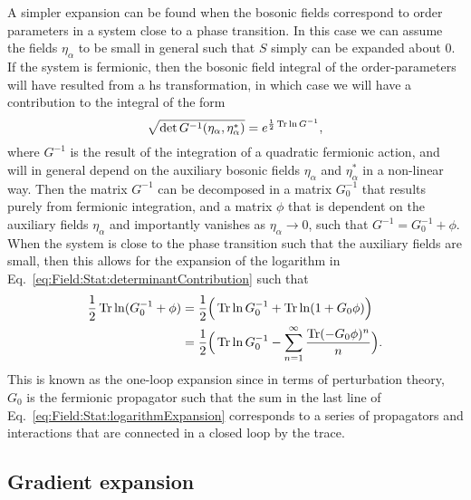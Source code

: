 A simpler expansion can be found when the bosonic fields correspond to order parameters in a system close to a phase transition. In this case
we can assume the fields $\eta_\alpha$ to be small in general such that $S$ simply can be expanded about $0$. If the system is fermionic, then
the bosonic field integral of the order-parameters will have resulted from a \ac{hs} transformation, in which case we will have
a contribution to the integral of the form
\begin{equation}
    \label{eq:Field:Stat:determinantContribution}
    \sqrt{\det G^{-1}(\eta_\alpha,\eta_\alpha^\ast)} = e^{\frac{1}{2}\operatorname{Tr}\ln G^{-1}},
\end{equation}
where $G^{-1}$ is the result of the integration of a quadratic fermionic action, and will in general depend on the auxiliary bosonic fields
$\eta_\alpha$ and $\eta_\alpha^\ast$ in a non-linear way. Then the matrix $G^{-1}$ can be decomposed in a matrix $G_0^{-1}$ that results purely
from fermionic integration, and a matrix $\phi$ that is dependent on the auxiliary fields $\eta_\alpha$ and importantly vanishes as $\eta_\alpha\to0$,
such that $G^{-1} = G_0^{-1} + \phi$. When the system is close to the phase transition such that the auxiliary fields are small, then this
allows for the expansion of the logarithm in Eq.~\eqref{eq:Field:Stat:determinantContribution} such that
\begin{equation}
    \label{eq:Field:Stat:logarithmExpansion}
    \begin{split}
        \frac{1}{2}\operatorname{Tr}\ln(G_0^{-1} + \phi) &= \frac{1}{2}\Big(\operatorname{Tr}\ln G_0^{-1} + \operatorname{Tr}\ln(1+G_0\phi)\Big)\\
        &= \frac{1}{2}\Big(\operatorname{Tr}\ln G_0^{-1} - \sum_{n=1}^\infty\frac{\operatorname{Tr} (-G_0\phi)^n}{n}\Big).
    \end{split}
\end{equation}
This is known as the one-loop expansion since in terms of perturbation theory, $G_0$ is the fermionic propagator such that the sum in the
last line of Eq.~\eqref{eq:Field:Stat:logarithmExpansion} corresponds to a series of propagators and interactions that are connected in
a closed loop by the trace.

\subsection{Gradient expansion}

